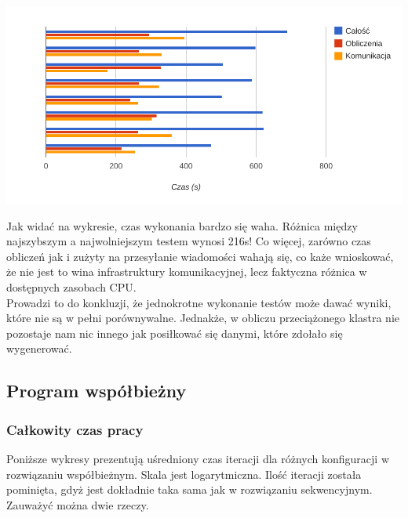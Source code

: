 \documentclass[paper=a4, fontsize=11pt]{scrartcl}	%
\numberwithin{equation}{section}		%
\numberwithin{figure}{section}			%
\numberwithin{table}{section}				%
\begin{document}
\begin{center}
    \includegraphics{report/var.pdf}
\end{center}

Jak widać na wykresie, czas wykonania bardzo się waha.
Różnica między najszybszym a najwolniejszym testem wynosi 216s! Co więcej,
zarówno czas obliczeń jak i zużyty na przesyłanie wiadomości wahają się, co każe
wnioskować, że nie jest to wina infrastruktury komunikacyjnej, lecz faktyczna
różnica w dostępnych zasobach CPU. \\

Prowadzi to do konkluzji, że jednokrotne wykonanie testów może dawać wyniki,
które nie są w pełni porównywalne. Jednakże, w obliczu przeciążonego klastra nie
pozostaje nam nic innego jak posiłkować się danymi, które zdołało się
wygenerować.


\subsection{Program współbieżny}

\subsubsection{Całkowity czas pracy}
Poniższe wykresy prezentują uśredniony czas iteracji dla różnych konfiguracji w
rozwiązaniu współbieżnym. Skala jest logarytmiczna. Ilość iteracji została
pominięta, gdyż jest dokładnie taka sama jak w rozwiązaniu sekwencyjnym.\\

Zauważyć można dwie rzeczy. \\
\end{document}
